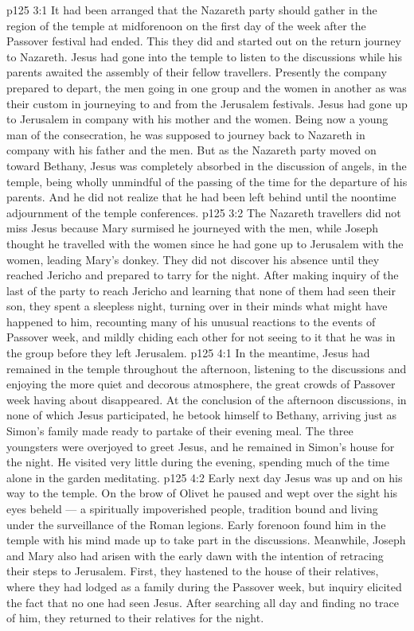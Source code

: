 \vs p125 3:1 It had been arranged that the Nazareth party should gather in the region of the temple at midforenoon on the first day of the week after the Passover festival had ended. This they did and started out on the return journey to Nazareth. Jesus had gone into the temple to listen to the discussions while his parents awaited the assembly of their fellow travellers. Presently the company prepared to depart, the men going in one group and the women in another as was their custom in journeying to and from the Jerusalem festivals. Jesus had gone up to Jerusalem in company with his mother and the women. Being now a young man of the consecration, he was supposed to journey back to Nazareth in company with his father and the men. But as the Nazareth party moved on toward Bethany, Jesus was completely absorbed in the discussion of angels, in the temple, being wholly unmindful of the passing of the time for the departure of his parents. And he did not realize that he had been left behind until the noontime adjournment of the temple conferences.
\vs p125 3:2 The Nazareth travellers did not miss Jesus because Mary surmised he journeyed with the men, while Joseph thought he travelled with the women since he had gone up to Jerusalem with the women, leading Mary’s donkey. They did not discover his absence until they reached Jericho and prepared to tarry for the night. After making inquiry of the last of the party to reach Jericho and learning that none of them had seen their son, they spent a sleepless night, turning over in their minds what might have happened to him, recounting many of his unusual reactions to the events of Passover week, and mildly chiding each other for not seeing to it that he was in the group before they left Jerusalem.
\vs p125 4:1 In the meantime, Jesus had remained in the temple throughout the afternoon, listening to the discussions and enjoying the more quiet and decorous atmosphere, the great crowds of Passover week having about disappeared. At the conclusion of the afternoon discussions, in none of which Jesus participated, he betook himself to Bethany, arriving just as Simon’s family made ready to partake of their evening meal. The three youngsters were overjoyed to greet Jesus, and he remained in Simon’s house for the night. He visited very little during the evening, spending much of the time alone in the garden meditating.
\vs p125 4:2 Early next day Jesus was up and on his way to the temple. On the brow of Olivet he paused and wept over the sight his eyes beheld --- a spiritually impoverished people, tradition bound and living under the surveillance of the Roman legions. Early forenoon found him in the temple with his mind made up to take part in the discussions. Meanwhile, Joseph and Mary also had arisen with the early dawn with the intention of retracing their steps to Jerusalem. First, they hastened to the house of their relatives, where they had lodged as a family during the Passover week, but inquiry elicited the fact that no one had seen Jesus. After searching all day and finding no trace of him, they returned to their relatives for the night.

